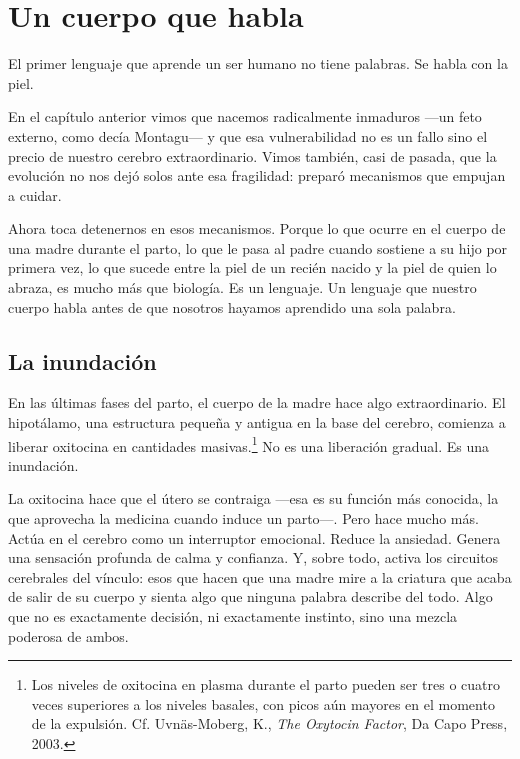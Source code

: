 \chapter{Un cuerpo que habla}

\epigraph{El primer lenguaje que aprende un ser humano no tiene palabras. Se habla con la piel.}{}

En el capítulo anterior vimos que nacemos radicalmente inmaduros ---un feto externo, como decía Montagu--- y que esa vulnerabilidad no es un fallo sino el precio de nuestro cerebro extraordinario. Vimos también, casi de pasada, que la evolución no nos dejó solos ante esa fragilidad: preparó mecanismos que empujan a cuidar.

Ahora toca detenernos en esos mecanismos. Porque lo que ocurre en el cuerpo de una madre durante el parto, lo que le pasa al padre cuando sostiene a su hijo por primera vez, lo que sucede entre la piel de un recién nacido y la piel de quien lo abraza, es mucho más que biología. Es un lenguaje. Un lenguaje que nuestro cuerpo habla antes de que nosotros hayamos aprendido una sola palabra.

\section{La inundación}

En las últimas fases del parto, el cuerpo de la madre hace algo extraordinario. El hipotálamo, una estructura pequeña y antigua en la base del cerebro, comienza a liberar oxitocina en cantidades masivas.\footnote{Los niveles de oxitocina en plasma durante el parto pueden ser tres o cuatro veces superiores a los niveles basales, con picos aún mayores en el momento de la expulsión. Cf. Uvnäs-Moberg, K., \textit{The Oxytocin Factor}, Da Capo Press, 2003.} No es una liberación gradual. Es una inundación.

La oxitocina hace que el útero se contraiga ---esa es su función más conocida, la que aprovecha la medicina cuando induce un parto---. Pero hace mucho más. Actúa en el cerebro como un interruptor emocional. Reduce la ansiedad. Genera una sensación profunda de calma y confianza. Y, sobre todo, activa los circuitos cerebrales del vínculo: esos que hacen que una madre mire a la criatura que acaba de salir de su cuerpo y sienta algo que ninguna palabra describe del todo. Algo que no es exactamente decisión, ni exactamente instinto, sino una mezcla poderosa de ambos.


